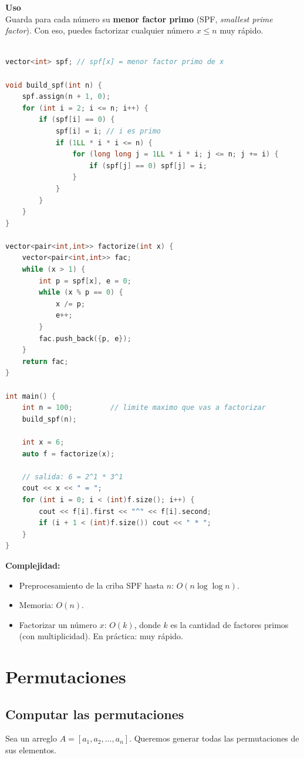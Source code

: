 \textbf{Uso} \\
Guarda para cada número su \textbf{menor factor primo} (SPF, \textit{smallest prime factor}).
Con eso, puedes factorizar cualquier número \(x \le n\) muy rápido.

\begin{lstlisting}[language=C++, caption={Criba SPF + factorización en primos}]

vector<int> spf; // spf[x] = menor factor primo de x

void build_spf(int n) {
	spf.assign(n + 1, 0);
	for (int i = 2; i <= n; i++) {
		if (spf[i] == 0) {
			spf[i] = i; // i es primo
			if (1LL * i * i <= n) {
				for (long long j = 1LL * i * i; j <= n; j += i) {
					if (spf[j] == 0) spf[j] = i;
				}
			}
		}
	}
}

vector<pair<int,int>> factorize(int x) {
	vector<pair<int,int>> fac;
	while (x > 1) {
		int p = spf[x], e = 0;
		while (x % p == 0) {
			x /= p;
			e++;
		}
		fac.push_back({p, e});
	}
	return fac;
}

int main() {
	int n = 100;         // limite maximo que vas a factorizar
	build_spf(n);

	int x = 6;
	auto f = factorize(x);

	// salida: 6 = 2^1 * 3^1
	cout << x << " = ";
	for (int i = 0; i < (int)f.size(); i++) {
		cout << f[i].first << "^" << f[i].second;
		if (i + 1 < (int)f.size()) cout << " * ";
	}
}
\end{lstlisting}

\textbf{Complejidad:}
\begin{itemize}
	\item Preprocesamiento de la criba SPF hasta \(n\): \(O(n \log\log n)\).
	\item Memoria: \(O(n)\).
	\item Factorizar un número \(x\): \(O(k)\), donde \(k\) es la cantidad de factores primos (con multiplicidad). En práctica: muy rápido.
\end{itemize}

\section{Permutaciones}

\subsection{Computar las permutaciones}

Sea un arreglo \(A = [a_1, a_2, \dots, a_n]\). Queremos generar todas las permutaciones de sus elementos.

